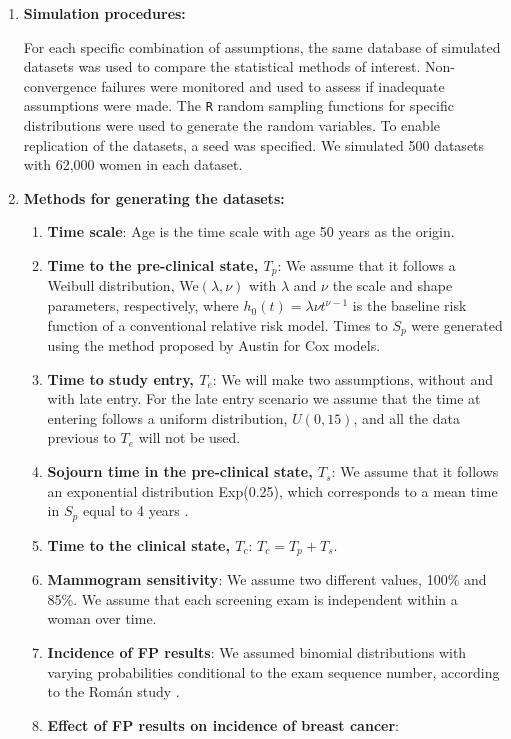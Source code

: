 \documentclass{bmcart}
\begin{document}
\begin{enumerate}
  \item \textbf{Simulation procedures:}

For each specific combination of assumptions, the same database of simulated datasets was used to
compare the statistical methods of interest. Non-convergence failures were monitored and used to
assess if inadequate assumptions were made. The {\tt R} random sampling functions for specific
distributions were used to generate the random variables. To enable replication of the datasets, a
seed was specified. We simulated 500 datasets with 62,000 women in each dataset. 

  \item \textbf{Methods for generating the datasets:} 

  \begin{enumerate}
    \item \textbf{Time scale}: Age is the time scale with age 50 years as the origin.
    \item \textbf{Time to the pre-clinical state, $T_p$}: We assume that it follows a Weibull
    distribution, We$(\lambda,\nu)$ with $\lambda$ and $\nu$ the scale and shape parameters,
    respectively, where $h_0(t)=\lambda \nu t^{\nu-1}$ is the baseline risk function of a
    conventional relative risk model. Times to $S_p$ were generated using the method proposed by
    Austin \cite{Austin2012, Bender2005} for Cox models.
    \item \textbf{Time to study entry, $T_e$}: We will make two assumptions, without and with late
    entry. For the late entry scenario we assume that the time at entering follows a uniform
    distribution, $U(0,15)$, and all the data previous to $T_e$ will not be used.
    \item \textbf{Sojourn time in the pre-clinical state, $T_s$}: We assume that it follows an
    exponential distribution Exp(0.25), which corresponds to a mean time in $S_p$ equal to 4 years
    \cite{Lee1998}.
    \item \textbf{Time to the clinical state, $T_c$}: $T_c=T_p+T_s$.
    \item \textbf{Mammogram sensitivity}: We assume two different values, 100\% and 85\%. We assume
    that each screening exam is independent within a woman over time.
    \item \textbf{Incidence of FP results}: We assumed binomial distributions with
    varying probabilities conditional to the exam sequence number, according to the Rom\'an study
    \cite{Roman2012}.
    \item \textbf{Effect of FP results on incidence of breast cancer}:  


\end{enumerate}
\end{enumerate}
\end{document}

